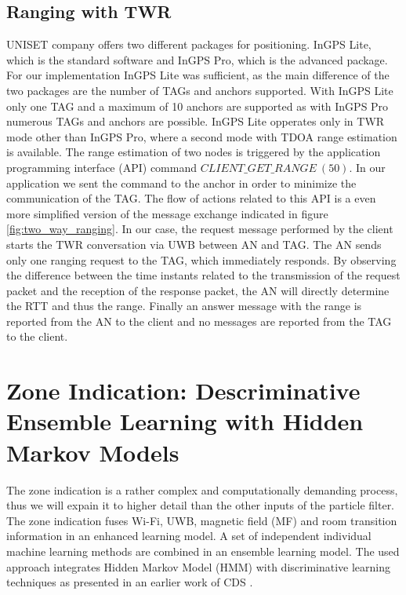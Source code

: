 \subsection{Ranging with TWR}
UNISET company offers two different packages for positioning. InGPS Lite, which is the standard software and InGPS Pro, which is the advanced package. For our implementation InGPS Lite was sufficient, as the main difference of the two packages are the number of TAGs and anchors supported. With InGPS Lite only one TAG and a maximum of 10 anchors are supported as with InGPS Pro numerous TAGs and anchors are possible. InGPS Lite opperates only in TWR mode other than InGPS Pro, where a second mode with TDOA range estimation is available.
The range estimation of two nodes is triggered by the application programming interface (API) command $CLIENT\_GET\_RANGE\ (50)$. In our application we sent the command to the anchor in order to minimize the communication of the TAG. The flow of actions related to this API is a even more simplified version of the message exchange indicated in figure \ref{fig:two_way_ranging}. In our case, the request message performed by the client starts the TWR conversation via UWB between AN and TAG. The AN sends only one ranging request to the TAG, which immediately responds. By observing the difference between the time instants related to the transmission of the request packet and the reception of the response packet, the AN will directly determine the RTT and thus the range. Finally an answer message with the range is reported from the AN to the client and no messages are reported from the TAG to the client.



\section{Zone Indication: Descriminative Ensemble Learning with Hidden Markov Models}
The zone indication is a rather complex and computationally demanding process, thus we will expain it to higher detail than the other inputs of the particle filter. The zone indication fuses Wi-Fi, UWB, magnetic field (MF) and room transition information in an enhanced learning model. A set of independent individual machine learning methods are combined in an ensemble learning model. The used approach integrates Hidden Markov Model (HMM) with discriminative learning techniques as presented in an earlier work of CDS \cite{Carrera2}.

